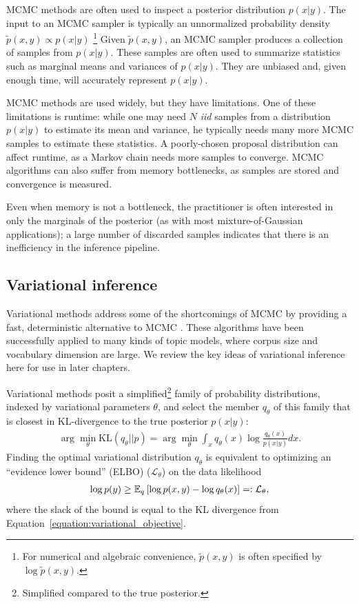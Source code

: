 MCMC methods are often used to inspect a posterior distribution $p(x |
y)$.  The input to an MCMC sampler is typically an unnormalized
probability density $\tilde p(x, y) \propto p(x | y)$ \footnote{For
  numerical and algebraic convenience, $\tilde p(x, y)$ is often
  specified by $\log \tilde p(x, y)$.}  Given $\tilde p(x, y)$, an
MCMC sampler produces a collection of samples from $p(x | y)$.  These
samples are often used to summarize statistics such as marginal means
and variances of $p(x | y)$.  They are unbiased and, given enough
time, will accurately represent $p(x | y)$.

MCMC methods are used widely, but they have limitations.
One of these limitations is runtime: while one may need $N$ \emph{iid}
samples from a distribution $p(x | y)$ to estimate its mean and
variance, he typically needs many more MCMC samples to estimate these
statistics.  A poorly-chosen proposal distribution can affect runtime,
as a Markov chain needs more samples to converge. MCMC algorithms can
also suffer from memory bottlenecks, as samples are stored and
convergence is measured.

Even when memory is not a bottleneck, the practitioner is often
interested in only the marginals of the posterior (as with most
mixture-of-Gaussian applications); a large number of discarded samples
indicates that there is an inefficiency in the inference pipeline.

\subsection{Variational inference}
\label{sec:variational_inference}

Variational methods address some of the shortcomings of MCMC by
providing a fast, deterministic alternative to MCMC
\cite{jordan:2003,jordan:1999}. These algorithms have been
successfully applied to many kinds of topic models, where corpus size
and vocabulary dimension are large.  We review the key ideas of
variational inference here for use in later chapters.

Variational methods posit a simplified\footnote{Simplified compared to
  the true posterior.} family of probability distributions, indexed by
variational parameters $\theta$, and select the member $q_\theta$ of
this family that is closest in KL-divergence to the true posterior
$p(x | y)$:
\begin{align}
  \arg \min_{\theta} \mbox{KL}(q_\theta || p) = \arg \min_{\theta} \int_x q_\theta(x) \log \frac{q_\theta(x)}{p(x | y)} dx.
  \label{equation:variational_objective}
\end{align}
Finding the optimal variational distribution $q_\theta$ is equivalent
to optimizing an ``evidence lower bound'' (ELBO) ($\mathcal{L}_\theta$) on
the data likelihood
\begin{eqnarray}
  \log p(y) \ge \mathbb{E}_q\left[\log p(x, y) - \log q_\theta(x)\right]
  =: \mathcal{L}_\theta,
  \label{equation:traditional_variational_objective}
\end{eqnarray}
where the slack of the bound is equal to the KL divergence from
Equation~\ref{equation:variational_objective}.

